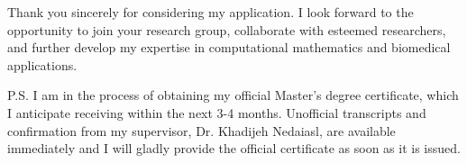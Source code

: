 \documentclass[10pt,stdletter,dateno]{newlfm}
\begin{document}
\begin{newlfm}
		Thank you sincerely for considering my application. I look forward to the opportunity to join your research group, collaborate with esteemed researchers, and further develop my expertise in computational mathematics and biomedical applications.  
		
		\vspace{1em}
		P.S. I am in the process of obtaining my official Master's degree certificate, which I anticipate receiving within the next 3-4 months. Unofficial transcripts and confirmation from my supervisor, Dr. Khadijeh Nedaiasl, are available immediately and I will gladly provide the official certificate as soon as it is issued.
		
	\end{newlfm}
\end{document}
